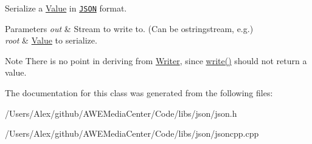 Serialize a \hyperlink{class_json_1_1_value}{Value} in \href{http://www.json.org}{\tt J\-S\-O\-N} format. 


\begin{DoxyParams}{Parameters}
{\em out} & Stream to write to. (Can be ostringstream, e.\-g.) \\
\hline
{\em root} & \hyperlink{class_json_1_1_value}{Value} to serialize. \\
\hline
\end{DoxyParams}
\begin{DoxyNote}{Note}
There is no point in deriving from \hyperlink{class_json_1_1_writer}{Writer}, since \hyperlink{class_json_1_1_styled_stream_writer_a07807741c6c43ecd35885a87234d0805}{write()} should not return a value. 
\end{DoxyNote}


The documentation for this class was generated from the following files\-:\begin{DoxyCompactItemize}
\item 
/\-Users/\-Alex/github/\-A\-W\-E\-Media\-Center/\-Code/libs/json/json.\-h\item 
/\-Users/\-Alex/github/\-A\-W\-E\-Media\-Center/\-Code/libs/json/jsoncpp.\-cpp\end{DoxyCompactItemize}
